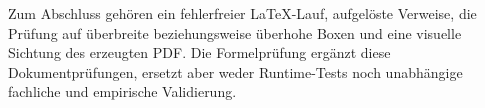 Zum Abschluss gehören ein fehlerfreier LaTeX-Lauf, aufgelöste Verweise,
die Prüfung auf überbreite beziehungsweise überhohe Boxen und eine
visuelle Sichtung des erzeugten PDF. Die Formelprüfung ergänzt diese
Dokumentprüfungen, ersetzt aber weder Runtime-Tests noch unabhängige
fachliche und empirische Validierung.
